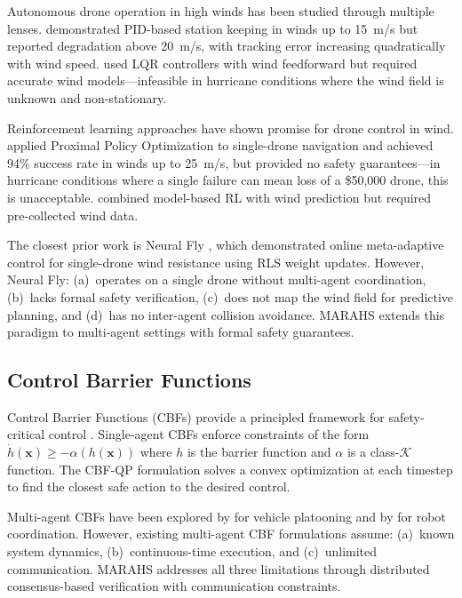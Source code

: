 \documentclass[12pt,a4paper,twocolumn]{article}
\newcommand{\cK}{\mathcal{K}}
\newcommand{\vect}[1]{\mathbf{#1}}
\begin{document}
Autonomous drone operation in high winds has been studied through multiple lenses. \citet{Duggal2020} demonstrated PID-based station keeping in winds up to 15~m/s but reported degradation above 20~m/s, with tracking error increasing quadratically with wind speed. \citet{Abichandani2019} used LQR controllers with wind feedforward but required accurate wind models---infeasible in hurricane conditions where the wind field is unknown and non-stationary.

Reinforcement learning approaches have shown promise for drone control in wind. \citet{PPO2017} applied Proximal Policy Optimization to single-drone navigation and achieved 94\% success rate in winds up to 25~m/s, but provided no safety guarantees---in hurricane conditions where a single failure can mean loss of a \$50,000 drone, this is unacceptable. \citet{Peng2021} combined model-based RL with wind prediction but required pre-collected wind data.

The closest prior work is Neural Fly \citep{NeuralFly2022}, which demonstrated online meta-adaptive control for single-drone wind resistance using RLS weight updates. However, Neural Fly: (a)~operates on a single drone without multi-agent coordination, (b)~lacks formal safety verification, (c)~does not map the wind field for predictive planning, and (d)~has no inter-agent collision avoidance. MARAHS extends this paradigm to multi-agent settings with formal safety guarantees.

\subsection{Control Barrier Functions}
\label{sec:related_cbf}

Control Barrier Functions (CBFs) provide a principled framework for safety-critical control \citep{Ames2014,Ames2019}. Single-agent CBFs enforce constraints of the form $\dot{h}(\vect{x}) \geq -\alpha(h(\vect{x}))$ where $h$ is the barrier function and $\alpha$ is a class-$\cK$ function. The CBF-QP formulation \citep{Ames2014} solves a convex optimization at each timestep to find the closest safe action to the desired control.

Multi-agent CBFs have been explored by \citet{Wang2018} for vehicle platooning and by \citet{Glotfelter2017} for robot coordination. However, existing multi-agent CBF formulations assume: (a)~known system dynamics, (b)~continuous-time execution, and (c)~unlimited communication. MARAHS addresses all three limitations through distributed consensus-based verification with communication constraints.
\end{document}
